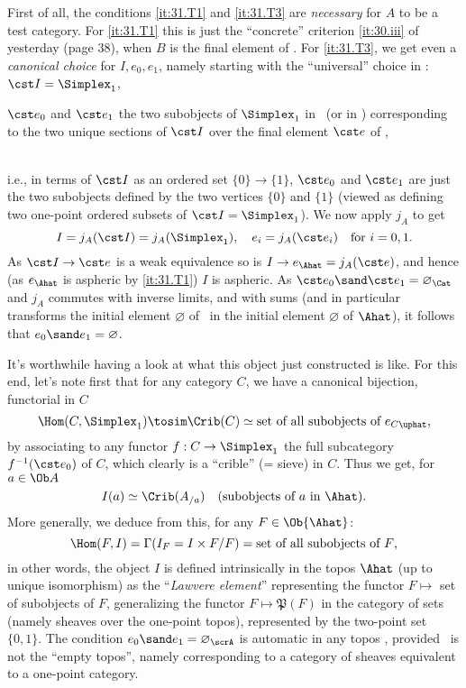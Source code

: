 First of all, the conditions \ref{it:31.T1} and \ref{it:31.T3} are
\emph{necessary} for $A$ to be a test category. For \ref{it:31.T1}
this is just the ``concrete'' criterion \ref{it:30.iii} of yesterday
(page 38), when $B$ is the final element of \Cat. For \ref{it:31.T3},
we get even a \emph{canonical choice} for $I,e_0,e_1$, namely starting
with the ``universal'' choice in \Cat:
  \\[\baselineskip]%
  \hspace*{3em}$\cst I = \Simplex_1$, \quad%
\parbox[t]{0.7\textwidth}{$\cst e_0$ and $\cst e_1$ the two subobjects of $\Simplex_1$ in \Cat\
  (or in \Ord) corresponding to the two unique sections of $\cst I$
  over the final element $\cst e$ of \Cat,}
  \\[\baselineskip]%
i.e., in terms of $\cst I$ as an ordered set $\{0\} \to \{1\}$, $\cst
e_0$ and $\cst e_1$ are just the two subobjects defined by the two
vertices $\{0\}$ and $\{1\}$ (viewed as defining two one-point ordered
subsets of $\cst I=\Simplex_1$). We now apply $j_A$ to get
\[ I = j_A(\cst I) = j_A(\Simplex_1), \quad e_i = j_A(\cst e_i) \quad
\text{for $i=0,1$.} \]
As $\cst I\to \cst e$ is a weak equivalence so is $I\to e_{\Ahat}
= j_A(\cst e)$, and hence (as $e_{\Ahat}$ is aspheric by
\ref{it:31.T1}) $I$ is aspheric. As $\cst e_0 \sand \cst e_1 =
\varnothing_\Cat$ and $j_A$ commutes with inverse limits, and with sums
(and in particular transforms the initial element $\varnothing$ of \Cat\
in the initial element $\varnothing$ of $\Ahat$), it follows that
$e_0 \sand e_1 = \varnothing$.

It's worthwhile having a look at what this object just constructed is
like. For this end, let's note first that for any category $C$, we
have a canonical bijection, functorial in $C$
\[ \Hom(C , \Simplex_1) \tosim \Crib(C) \simeq \text{set of all
  subobjects of $e_{C\uphat}$,}\]
by associating to any functor $f : C \to \Simplex_1$ the full
subcategory $f^{-1}(\cst e_0)$ of $C$, which clearly is a ``crible'' (= sieve)
in $C$. Thus we get, for $a\in\Ob A$
\[ I(a) \simeq \Crib(A_{/a}) \quad \text{(subobjects of $a$ in
  $\Ahat$).}\]
More generally, we deduce from this, for any $F\in\Ob{\Ahat}$:
\[ \Hom(F,I) = \Gamma(I_F = I\times F/F) = \text{set of all subobjects
  of $F$,} \]
in other words, the object $I$ is defined intrinsically in the topos
$\Ahat$ (up to unique isomorphism) as the ``\emph{Lawvere
  element}'' representing the functor $F \mapsto$ set of subobjects of
$F$, generalizing the functor $F \mapsto \mathfrak P(F)$ in the
category of sets (namely sheaves over the one-point topos),
represented by the two-point set $\{0,1\}$. The condition $e_0\sand e_1
=\varnothing_\scrA$ is automatic in any topos \scrA, provided \scrA\ is
not the ``empty topos'', namely corresponding to a category of sheaves
equivalent to a one-point category.

